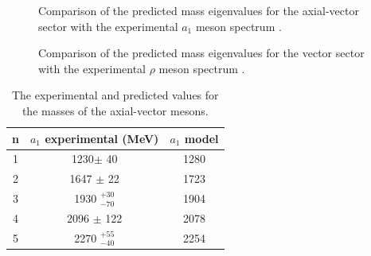 \begin{figure}[htb]
\caption{Comparison of the predicted mass eigenvalues for the axial-vector sector with the experimental $a_1$ meson spectrum \cite{PDG}.}
\end{figure}
\nopagebreak
\begin{figure}[htb]
\caption{Comparison of the predicted mass eigenvalues for the vector sector with the experimental $\rho$ meson spectrum \cite{PDG}.}
\label{figRho}
\end{figure}


\begin{table}[htb]
\center
\begin{tabular}{| c || c | c  |}
\hline
n & $a_1$ experimental (MeV) & $a_1$ model \\
\hline
1 & 1230$\pm$ 40 &	    	1280	 \\
2 & 1647 $\pm$ 22 & 	1723	 \\
3 & 1930  $^{+30}_{-70}$ & 1904\\
4 & 2096 $\pm$ 122 &      2078	 \\ 
5 & 2270 $^{+55}_{-40}$  & 2254\\
\hline
\end{tabular}
\caption{The experimental \cite{PDG} and predicted values for the masses of the axial-vector mesons.}
\label{tabAxial}
\end{table}


